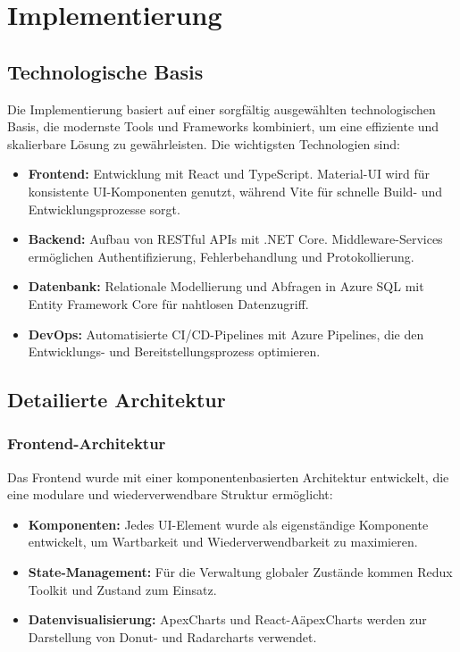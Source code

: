 \chapter{Implementierung}
\label{chap:implementierung}

\section{Technologische Basis}
Die Implementierung basiert auf einer sorgfältig ausgewählten technologischen Basis, die modernste Tools und Frameworks kombiniert, um eine effiziente und skalierbare Lösung zu gewährleisten. Die wichtigsten Technologien sind:
\begin{itemize}
    \item \textbf{Frontend:} Entwicklung mit React und TypeScript. Material-UI wird für konsistente UI-Komponenten genutzt, während Vite für schnelle Build- und Entwicklungsprozesse sorgt.
    \item \textbf{Backend:} Aufbau von RESTful APIs mit .NET Core. Middleware-Services ermöglichen Authentifizierung, Fehlerbehandlung und Protokollierung.
    \item \textbf{Datenbank:} Relationale Modellierung und Abfragen in Azure SQL mit Entity Framework Core für nahtlosen Datenzugriff.
    \item \textbf{DevOps:} Automatisierte CI/CD-Pipelines mit Azure Pipelines, die den Entwicklungs- und Bereitstellungsprozess optimieren.
\end{itemize}

\section{Detailierte Architektur}
\subsection{Frontend-Architektur}
Das Frontend wurde mit einer komponentenbasierten Architektur entwickelt, die eine modulare und wiederverwendbare Struktur ermöglicht:
\begin{itemize}
    \item \textbf{Komponenten:} Jedes UI-Element wurde als eigenständige Komponente entwickelt, um Wartbarkeit und Wiederverwendbarkeit zu maximieren.
    \item \textbf{State-Management:} Für die Verwaltung globaler Zustände kommen Redux Toolkit und Zustand zum Einsatz.
    \item \textbf{Datenvisualisierung:} ApexCharts und React-AäpexCharts werden zur Darstellung von Donut- und Radarcharts verwendet.
\end{itemize}

